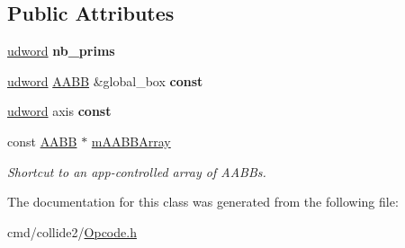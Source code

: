 \subsection*{Public Attributes}
\begin{DoxyCompactItemize}
\item 
\hyperlink{IceTypes_8h_a44c6f1920ba5551225fb534f9d1a1733}{udword} {\bfseries nb\+\_\+prims}\hypertarget{classOpcode_1_1AABBTreeOfAABBsBuilder_aeda251056c36240467ca6ad743e3b414}{}\label{classOpcode_1_1AABBTreeOfAABBsBuilder_aeda251056c36240467ca6ad743e3b414}

\item 
\hyperlink{IceTypes_8h_a44c6f1920ba5551225fb534f9d1a1733}{udword} \hyperlink{classOpcode_1_1AABB}{A\+A\+BB} \&global\+\_\+box {\bfseries const}\hypertarget{classOpcode_1_1AABBTreeOfAABBsBuilder_af0d5368a7326bf8acc68ed7222f86598}{}\label{classOpcode_1_1AABBTreeOfAABBsBuilder_af0d5368a7326bf8acc68ed7222f86598}

\item 
\hyperlink{IceTypes_8h_a44c6f1920ba5551225fb534f9d1a1733}{udword} axis {\bfseries const}\hypertarget{classOpcode_1_1AABBTreeOfAABBsBuilder_a48deb508c42f725dcbae24b675d57492}{}\label{classOpcode_1_1AABBTreeOfAABBsBuilder_a48deb508c42f725dcbae24b675d57492}

\item 
const \hyperlink{classOpcode_1_1AABB}{A\+A\+BB} $\ast$ \hyperlink{classOpcode_1_1AABBTreeOfAABBsBuilder_af2fe709b3e7643b8ef54a8adb1ab5e01}{m\+A\+A\+B\+B\+Array}\hypertarget{classOpcode_1_1AABBTreeOfAABBsBuilder_af2fe709b3e7643b8ef54a8adb1ab5e01}{}\label{classOpcode_1_1AABBTreeOfAABBsBuilder_af2fe709b3e7643b8ef54a8adb1ab5e01}

\begin{DoxyCompactList}\small\item\em Shortcut to an app-\/controlled array of A\+A\+B\+Bs. \end{DoxyCompactList}\end{DoxyCompactItemize}


The documentation for this class was generated from the following file\+:\begin{DoxyCompactItemize}
\item 
cmd/collide2/\hyperlink{Opcode_8h}{Opcode.\+h}\end{DoxyCompactItemize}

